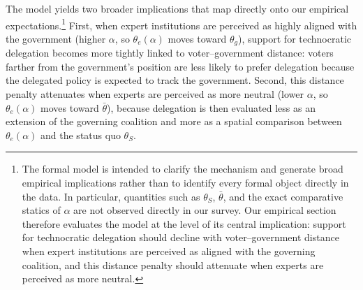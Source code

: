 \documentclass[11pt]{article}\usepackage[]{graphicx}\usepackage[]{xcolor}
\begin{document}
The model yields two broader implications that map directly onto our empirical expectations.\footnote{The formal model is intended to clarify the mechanism and generate broad empirical implications rather than to identify every formal object directly in the data. In particular, quantities such as $\theta_S$, $\bar{\theta}$, and the exact comparative statics of $\alpha$ are not observed directly in our survey. Our empirical section therefore evaluates the model at the level of its central implication: support for technocratic delegation should decline with voter--government distance when expert institutions are perceived as aligned with the governing coalition, and this distance penalty should attenuate when experts are perceived as more neutral.} First, when expert institutions are perceived as highly aligned with the government (higher $\alpha$, so $\theta_e(\alpha)$ moves toward $\theta_g$), support for technocratic delegation becomes more tightly linked to voter--government distance: voters farther from the government's position are less likely to prefer delegation because the delegated policy is expected to track the government. Second, this distance penalty attenuates when experts are perceived as more neutral (lower $\alpha$, so $\theta_e(\alpha)$ moves toward $\bar{\theta}$), because delegation is then evaluated less as an extension of the governing coalition and more as a spatial comparison between $\theta_e(\alpha)$ and the status quo $\theta_S$.

\end{document}
